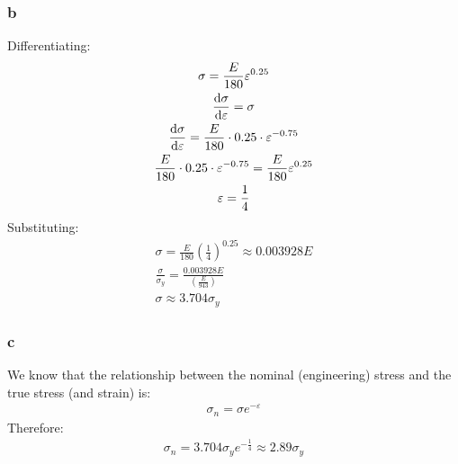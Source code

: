 \documentclass[11pt]{article}
\numberwithin{equation}{section}
\begin{document}
\subsubsection{b}
Differentiating:
\begin{gather}
    \sigma  = \frac{E}{180}\varepsilon^{0.25}\\
    \frac{\dif \sigma}{\dif \varepsilon} = \sigma\\
    \frac{\dif \sigma}{\dif \varepsilon} = \frac{E}{180}\cdot 0.25 \cdot \varepsilon^{-0.75}\\
    \frac{E}{180}\cdot 0.25 \cdot \varepsilon^{-0.75} = \frac{E}{180}\varepsilon^{0.25}\\
    \varepsilon = \frac{1}{4}
\end{gather}
Substituting:
\begin{gather}
    \sigma = \frac{E}{180}\left(\frac{1}{4}\right)^{0.25} \approx 0.003928E\\
    \frac{\sigma}{\sigma_y} = \frac{0.003928E}{\left(\frac{E}{943}\right)}\\
    \sigma \approx 3.704 \sigma_y
\end{gather}
\subsubsection{c}
We know that the relationship between the nominal (engineering) stress and the true stress (and strain) is:
\begin{gather}
    \sigma_n = \sigma e^{-\varepsilon}
\end{gather}
Therefore:
\begin{gather}
    \sigma_n = 3.704\sigma_y e^{-\frac{1}{4}} \approx 2.89\sigma_y
\end{gather}
\end{document}
